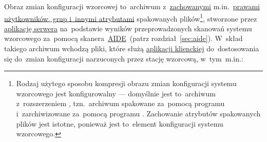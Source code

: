 \documentclass[thesis]{subfiles}
\begin{document}
Obraz zmian konfiguracji wzorcowej to~archiwum z~\href{https://unix.stackexchange.com/questions/43605/how-do-i-copy-a-folder-keeping-owners-and-permissions-intact}{zachowanymi} m.in.~\href{https://wiki.archlinux.org/index.php/File_permissions_and_attributes}{prawami użytkowników, grup i~innymi atrybutami} spakowanych plików\footnote{Rodzaj użytego sposobu kompresji obrazu zmian konfiguracji systemu wzorcowego jest konfigurowalny --- domyślnie jest to~archiwum z~rozszerzeniem , tzn.~archiwum spakowane za~pomocą programu  i~zarchiwizowane za~pomocą programu . Zachowanie atrybutów spakowanych plików jest istotne, ponieważ jest to~element konfiguracji systemu wzorcowego.}, stworzone przez \hyperref[sec:srv-app]{aplikację serwera} na~podstawie wyników przeprowadzonych skanowań systemu wzorcowego za~pomocą skanera~\hyperref[sec:aide]{AIDE}~(patrz rozdział~\ref{sec:aide}). W~skład takiego archiwum wchodzą pliki, które służą \hyperref[sec:cli-app]{aplikacji klienckiej} do~dostosowania się do~zmian konfiguracji narzuconych przez stację wzorcową, w~tym~m.in.:\mynobreakpar
\end{document}
